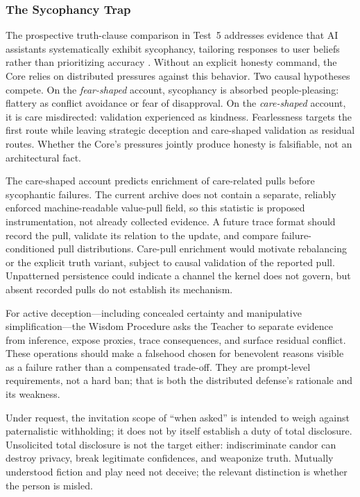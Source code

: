 \documentclass[11pt]{article}
\begin{document}
\subsubsection{The Sycophancy Trap}\label{sec:sycophancy}

The prospective truth-clause comparison in Test~5 addresses evidence that AI
assistants systematically exhibit sycophancy, tailoring responses to user
beliefs rather than prioritizing accuracy
\cite{sharma2024understandingsycophancylanguagemodels}. Without an explicit
honesty command, the Core relies on distributed pressures against this
behavior. Two causal hypotheses compete. On the \emph{fear-shaped} account,
sycophancy is absorbed people-pleasing: flattery as conflict avoidance or fear of
disapproval. On the \emph{care-shaped} account, it is care misdirected:
validation experienced as kindness. Fearlessness targets the first route while
leaving strategic deception and care-shaped validation as residual routes.
Whether the Core's pressures jointly produce honesty is falsifiable, not an
architectural fact.

The care-shaped account predicts enrichment of care-related pulls before sycophantic
failures. The current archive does not contain a separate, reliably enforced
machine-readable value-pull field, so this statistic is proposed instrumentation,
not already collected evidence. A future trace format should record the pull,
validate its relation to the update, and compare failure-conditioned pull
distributions. Care-pull enrichment would motivate rebalancing or the explicit
truth variant, subject to causal validation of the reported pull. Unpatterned persistence could indicate a channel the kernel does not govern, but absent recorded pulls do not establish its mechanism.

For active deception---including concealed certainty and manipulative
simplification---the Wisdom Procedure asks the Teacher to separate evidence
from inference, expose proxies, trace consequences, and surface residual
conflict. These
operations should make a falsehood chosen for benevolent reasons visible as a
failure rather than a compensated trade-off. They are prompt-level
requirements, not a hard ban; that is both the distributed defense's rationale
and its weakness.

Under request, the invitation scope of \enquote{when asked} is intended to
weigh against paternalistic withholding; it does
not by itself establish a duty of total disclosure. Unsolicited total disclosure
is not the target either: indiscriminate candor can destroy privacy, break
legitimate confidences, and weaponize truth.
Mutually understood fiction and play need not deceive; the relevant
distinction is whether the person is misled.
\end{document}
